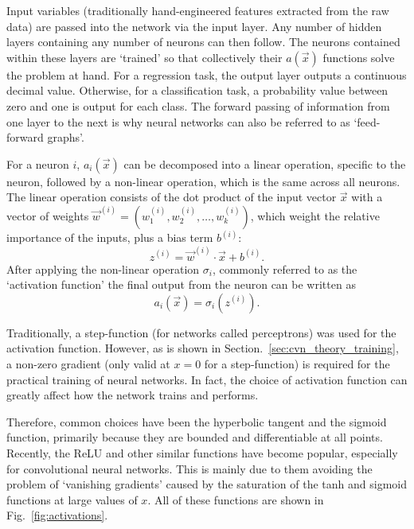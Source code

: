Input variables (traditionally hand-engineered features extracted from the raw data) are passed
into the network via the input layer. Any number of hidden layers containing any number of neurons
can then follow. The neurons contained within these layers are `trained' so that collectively
their $a(\vec{x})$ functions solve the problem at hand. For a regression task, the output layer
outputs a continuous decimal value. Otherwise, for a classification task, a probability value
between zero and one is output for each class. The forward passing of information from one layer
to the next is why neural networks can also be referred to as `feed-forward graphs'.

For a neuron $i$, $a_{i}(\vec{x})$ can be decomposed into a linear operation, specific to the
neuron, followed by a non-linear operation, which is the same across all neurons. The linear
operation consists of the dot product of the input vector $\vec{x}$ with a vector of weights
$\vec{w}^{(i)} = (w_{1}^{(i)}, w_{2}^{(i)},\dots,w_{k}^{(i)})$, which weight the relative
importance of the inputs, plus a bias term $b^{(i)}$:
\begin{equation} %
    z^{(i)}=\vec{w}^{(i)}\cdot\vec{x}+b^{(i)}.
    \label{eq:network}
\end{equation}
After applying the non-linear operation $\sigma_{i}$, commonly referred to as the `activation
function' the final output from the neuron can be written as
\begin{equation} %
    a_{i}(\vec{x})=\sigma_{i}(z^{(i)}).
    \label{eq:activation}
\end{equation}

Traditionally, a step-function (for networks called perceptrons) was used for the activation
function. However, as is shown in Section.~\ref{sec:cvn_theory_training}, a non-zero gradient
(only valid at $x=0$ for a step-function) is required for the practical training of neural
networks. In fact, the choice of activation function can greatly affect how the network trains and
performs.

Therefore, common choices have been the hyperbolic tangent and the sigmoid function, primarily
because they are bounded and differentiable at all points. Recently, the ReLU and other similar
functions have become popular, especially for convolutional neural networks. This is mainly due to
them avoiding the problem of `vanishing gradients' caused by the saturation of the tanh and
sigmoid functions at large values of $x$. All of these functions are shown in
Fig.~\ref{fig:activations}.

